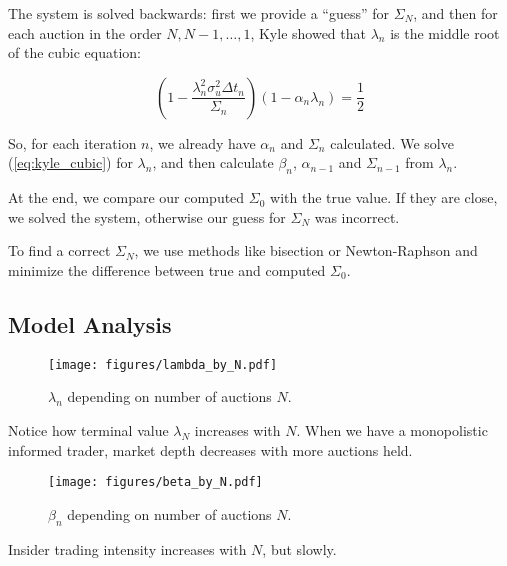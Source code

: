\documentclass{beamer}
\begin{document}
\begin{frame}
The system is solved backwards: first we provide a ``guess'' for $\Sigma_N$, and then for each auction in the order $N, N - 1, \ldots, 1$, Kyle showed that $\lambda_n$ is the middle root of the cubic equation:

\begin{equation}\label{eq:kyle_cubic}
    \left(1 - \dfrac{\lambda_n^2\sigma_u^2\Delta t_n}{\Sigma_n}\right)(1 - \alpha_n\lambda_n) = \dfrac{1}{2}
\end{equation}

So, for each iteration $n$, we already have $\alpha_n$ and $\Sigma_n$ calculated. We solve (\ref{eq:kyle_cubic}) for $\lambda_n$, and then calculate $\beta_n$, $\alpha_{n-1}$ and $\Sigma_{n-1}$ from $\lambda_n$. 

At the end, we compare our computed $\Sigma_0$ with the true value. If they are close, we solved the system, otherwise our guess for $\Sigma_N$ was incorrect. 

To find a correct $\Sigma_N$, we use methods like bisection or Newton-Raphson and minimize the difference between true and computed $\Sigma_0$.

\end{frame}

\subsection{Model Analysis}

\begin{frame}
    \begin{figure}\label{fig:lambda_on_N}
        \texttt{[image: figures/lambda\_by\_N.pdf]}
        \caption{$\lambda_n$ depending on number of auctions $N$.}
    \end{figure}

    Notice how terminal value $\lambda_N$ increases with $N$. When we have a monopolistic informed trader, market depth decreases with more auctions held.
\end{frame}

\begin{frame}
    \begin{figure}\label{fig:beta_on_N}
        \texttt{[image: figures/beta\_by\_N.pdf]}
        \caption{$\beta_n$ depending on number of auctions $N$.}
    \end{figure}

    Insider trading intensity increases with $N$, but slowly.

\end{frame}
\end{document}
